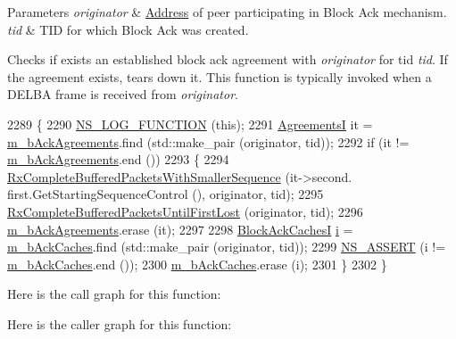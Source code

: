 \begin{DoxyParams}{Parameters}
{\em originator} & \hyperlink{classns3_1_1Address}{Address} of peer participating in Block Ack mechanism. \\
\hline
{\em tid} & T\+ID for which Block Ack was created.\\
\hline
\end{DoxyParams}
Checks if exists an established block ack agreement with {\itshape originator} for tid {\itshape tid}. If the agreement exists, tears down it. This function is typically invoked when a D\+E\+L\+BA frame is received from {\itshape originator}. 
\begin{DoxyCode}
2289 \{
2290   \hyperlink{log-macros-disabled_8h_a90b90d5bad1f39cb1b64923ea94c0761}{NS\_LOG\_FUNCTION} (\textcolor{keyword}{this});
2291   \hyperlink{classns3_1_1MacLow_a7876cc9b328cdb0508f2a7b7647eab10}{AgreementsI} it = \hyperlink{classns3_1_1MacLow_a53482df1a7e6f136cfa8ce50fa10adc2}{m\_bAckAgreements}.find (std::make\_pair (originator, tid));
2292   \textcolor{keywordflow}{if} (it != \hyperlink{classns3_1_1MacLow_a53482df1a7e6f136cfa8ce50fa10adc2}{m\_bAckAgreements}.end ())
2293     \{
2294       \hyperlink{classns3_1_1MacLow_aaed81a6cbf94baf2b2f17b9f96b8474d}{RxCompleteBufferedPacketsWithSmallerSequence} (it->second.
      first.GetStartingSequenceControl (), originator, tid);
2295       \hyperlink{classns3_1_1MacLow_aeadf392d37d323fb81f0ef0766f2359a}{RxCompleteBufferedPacketsUntilFirstLost} (originator, tid);
2296       \hyperlink{classns3_1_1MacLow_a53482df1a7e6f136cfa8ce50fa10adc2}{m\_bAckAgreements}.erase (it);
2297 
2298       \hyperlink{classns3_1_1MacLow_ae0b0abf84b6078031fabd4e85e1cb1bf}{BlockAckCachesI} \hyperlink{bernuolliDistribution_8m_a6f6ccfcf58b31cb6412107d9d5281426}{i} = \hyperlink{classns3_1_1MacLow_a1a2b5d95cae95e9b99e6508d7d350b47}{m\_bAckCaches}.find (std::make\_pair (originator, tid));
2299       \hyperlink{assert_8h_a6dccdb0de9b252f60088ce281c49d052}{NS\_ASSERT} (i != \hyperlink{classns3_1_1MacLow_a1a2b5d95cae95e9b99e6508d7d350b47}{m\_bAckCaches}.end ());
2300       \hyperlink{classns3_1_1MacLow_a1a2b5d95cae95e9b99e6508d7d350b47}{m\_bAckCaches}.erase (i);
2301     \}
2302 \}
\end{DoxyCode}


Here is the call graph for this function\+:




Here is the caller graph for this function\+:


